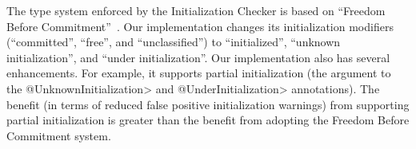 
The type system enforced by the Initialization Checker is based on
``Freedom Before Commitment''~\cite{SummersM2011}.  Our implementation
changes its initialization modifiers (``committed'', ``free'', and
``unclassified'') to ``initialized'', ``unknown initialization'', and
``under initialization''.  Our implementation also has several
enhancements.  For example, it supports partial initialization (the
argument to the \<@UnknownInitialization> and \<@UnderInitialization>
annotations).  The benefit (in terms of reduced false positive
initialization warnings) from supporting partial initialization is
greater than the benefit from adopting the Freedom Before Commitment system.



